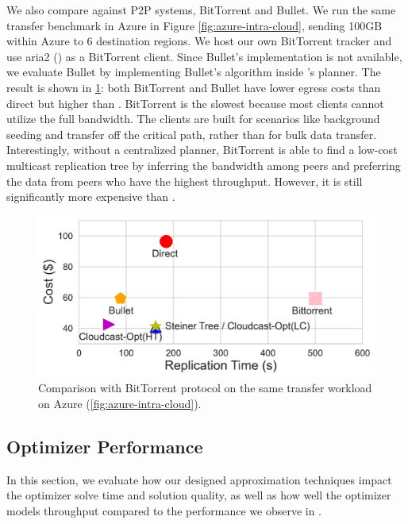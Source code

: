 We also compare \sys{} against P2P systems, BitTorrent and Bullet. 
We run the same transfer benchmark in Azure in Figure \ref{fig:azure-intra-cloud}, sending 100GB within Azure to 6 destination regions. We host our own BitTorrent tracker and use aria2 (\cite{aria2}) as a BitTorrent client. Since Bullet's implementation is not available, we evaluate Bullet by implementing Bullet's algorithm inside \sys{}'s planner. The result is shown in \cref{fig:p2p_comparison}: both BitTorrent and Bullet have lower egress costs than direct but higher than \sys{}. BitTorrent is the slowest because most clients cannot utilize the full bandwidth. The clients are built for scenarios like background seeding and transfer off the critical path, rather than for bulk data transfer. Interestingly, without a centralized planner, BitTorrent is able to find a low-cost multicast replication tree by inferring the bandwidth among peers and preferring the data from peers who have the highest throughput. However, it is still significantly more expensive than \sys{}. 

\begin{figure}[t]
    \centering
    \includegraphics[width=0.75\linewidth]{figures/p2p-comparison-all.pdf}
    \caption{Comparison with BitTorrent protocol on the same transfer workload on Azure (\cref{fig:azure-intra-cloud}). 
    }
    \label{fig:p2p_comparison}
\end{figure}

\subsection{Optimizer Performance}
In this section, we evaluate how our designed approximation techniques impact the optimizer solve time and solution quality, as well as how well the optimizer models throughput compared to the performance we observe in \sys{}. 

